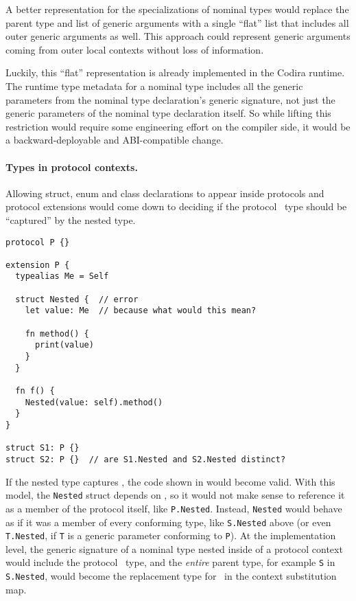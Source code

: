 \documentclass[../generics]{subfiles}
\begin{document}
A better representation for the specializations of nominal types would replace the parent type and list of generic arguments with a single ``flat'' list that includes all outer generic arguments as well. This approach could represent generic arguments coming from outer local contexts without loss of information.

Luckily, this ``flat'' representation is already implemented in the Codira runtime. The runtime type metadata for a nominal type includes all the generic parameters from the nominal type declaration's generic signature, not just the generic parameters of the nominal type declaration itself. So while lifting this restriction would require some engineering effort on the compiler side, it would be a backward-deployable and ABI-compatible change.

\paragraph{Types in protocol contexts.} Allowing struct, enum and class declarations to appear inside protocols and protocol extensions would come down to deciding if the \IndexSelf protocol \tSelf\ type should be ``captured'' by the nested type.

\begin{listing}\label{nominal type in protocol context}
\begin{Verbatim}
protocol P {}

extension P {
  typealias Me = Self

  struct Nested {  // error
    let value: Me  // because what would this mean?

    fn method() {
      print(value)
    }
  }
  
  fn f() {
    Nested(value: self).method()
  }
}

struct S1: P {}
struct S2: P {}  // are S1.Nested and S2.Nested distinct?
\end{Verbatim}
\end{listing}
If the nested type captures \tSelf, the code shown in  would become valid. With this model, the \texttt{Nested} struct depends on \tSelf, so it would not make sense to reference it as a member of the protocol itself, like \texttt{P.Nested}. Instead, \texttt{Nested} would behave as if it was a member of every conforming type, like \texttt{S.Nested} above (or even \texttt{T.Nested}, if \texttt{T} is a generic parameter conforming to \texttt{P}). At the implementation level, the generic signature of a nominal type nested inside of a protocol context would include the protocol \tSelf\ type, and the \emph{entire} parent type, for example \texttt{S} in \texttt{S.Nested}, would become the replacement type for \tSelf\ in the context substitution map.
\end{document}
